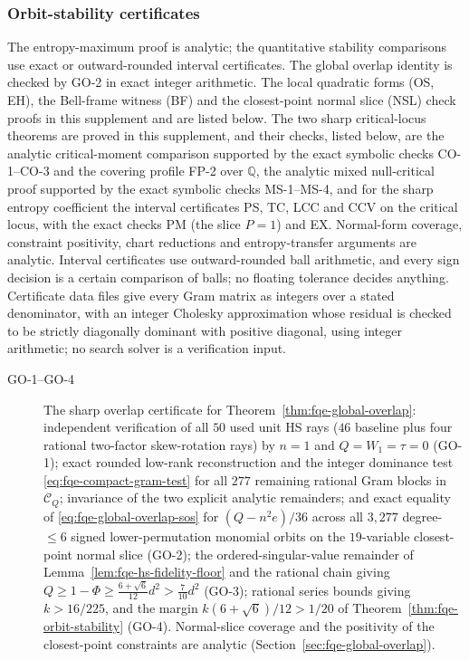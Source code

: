 \subsubsection*{Orbit-stability certificates}\label{sec:fqe-stability-verifiers}
The entropy-maximum proof is analytic; the quantitative stability comparisons use exact or
outward-rounded interval certificates. The global overlap identity is checked by GO-2 in exact integer arithmetic. The local quadratic forms (OS, EH), the
Bell-frame witness (BF) and the closest-point normal slice (NSL) check proofs in this supplement and are listed below. The two sharp critical-locus
theorems are proved in this supplement, and their checks, listed below, are the analytic
critical-moment comparison supported by the exact symbolic checks CO-1--CO-3 and the covering profile FP-2 over $\mathbb Q$, the analytic mixed null-critical proof supported by the exact symbolic checks MS-1--MS-4, and for the sharp entropy coefficient the interval certificates PS, TC, LCC and CCV on the
critical locus, with the exact checks PM (the slice $P=1$) and EX. Normal-form coverage, constraint positivity,
chart reductions and entropy-transfer arguments are analytic. Interval certificates use outward-rounded
ball arithmetic, and every sign decision is a certain comparison of balls; no floating tolerance decides
anything. Certificate data files give every Gram matrix as integers over a stated denominator, with an
integer Cholesky approximation whose residual is checked to be strictly diagonally dominant with positive
diagonal, using integer arithmetic; no search solver is a verification input.
\begin{description}
\item[GO-1--GO-4] The sharp overlap certificate for Theorem~\ref{thm:fqe-global-overlap}:
independent verification of all $50$ used unit HS rays ($46$ baseline plus four rational two-factor
skew-rotation rays) by $n=1$ and $Q=W_1=\tau=0$ (GO-1); exact rounded low-rank reconstruction and the integer dominance test
\eqref{eq:fqe-compact-gram-test} for all $277$ remaining rational Gram blocks in $\mathcal C_Q$;
invariance of the two explicit analytic remainders; and exact equality
of \eqref{eq:fqe-global-overlap-sos} for $(Q-n^2e)/36$ across all $3{,}277$ degree-$\le6$ signed
lower-permutation monomial orbits on the $19$-variable closest-point normal slice (GO-2); the
ordered-singular-value remainder of Lemma~\ref{lem:fqe-hs-fidelity-floor} and the rational chain giving
$Q\ge1-\Phi\ge\frac{6+\sqrt6}{12}d^2>\frac7{10}d^2$ (GO-3); rational series bounds giving $k>16/225$, and the
margin $k(6+\sqrt6)/12>1/20$ of Theorem~\ref{thm:fqe-orbit-stability} (GO-4). Normal-slice coverage and the
positivity of the closest-point constraints are analytic (Section~\ref{sec:fqe-global-overlap}).
\end{description}
